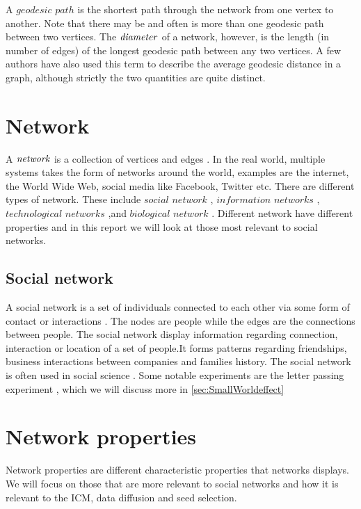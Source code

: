 A $geodesic$ $path$ is the shortest path through the network from one vertex to another. Note that there may be and often is more than one geodesic path between two vertices. The $\it{{diameter}}$ of a network, however,  is the length (in number of edges) of the longest geodesic path between any two vertices. A few authors have also used this term to describe the average geodesic distance in a graph, although strictly the two quantities are quite distinct.

\section{Network}
A $\it{network}$ is a collection of vertices and edges  \cite{ComplexNetwork2003}. In the real world, multiple systems takes the form of networks around the world, examples are the internet, the World Wide Web, social media like Facebook, Twitter etc.  There are different types of network. These include  $social$ $network$ \cite{ComplexNetwork2003}, ${information}$ ${networks}$ \cite{ComplexNetwork2003}, $technological$ $networks$ \cite{ComplexNetwork2003} ,and $biological$ $network$ \cite{ComplexNetwork2003}. Different network have different properties and in this report we will look at those most relevant to social networks.

\subsection{Social network}
A social network is a set of individuals connected to each other via some form of contact or interactions \cite{ComplexNetwork2003}. The nodes are people while the edges are the connections between people. The social network display information regarding connection, interaction or location of a set of people.It forms patterns regarding friendships, business interactions between companies and families history. The social network is often used in social science \cite{ComplexNetwork2003}. Some notable experiments are the letter passing experiment \cite{smallWorldExperiment1969}, which we will discuss more in \ref{sec:SmallWorldeffect} 

\section{Network properties}
Network properties are different characteristic properties that networks displays. We will focus on those that are more relevant to social networks and how it is relevant to the ICM, data diffusion and seed selection.

